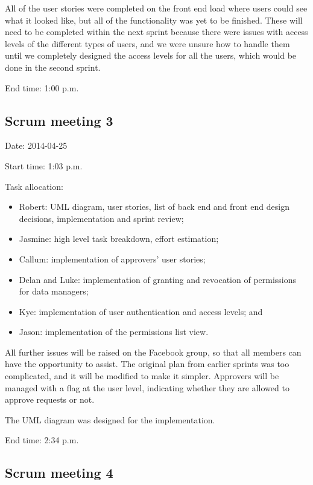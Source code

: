 \documentclass[a4paper,titlepage,12pt]{article}
\begin{document}
All of the user stories were completed on the front end load where users could
see what it looked like, but all of the functionality was yet to be finished.
These will need to be completed within the next sprint because there were
issues with access levels of the different types of users, and we were unsure
how to handle them until we completely designed the access levels for all the
users, which would be done in the second sprint.

End time: 1:00 p.m.

\newpage

\subsection{Scrum meeting 3}

Date: 2014-04-25

Start time: 1:03 p.m.

Task allocation:

\begin{itemize}
	\item Robert: UML diagram, user stories, list of back end and front end
	      design decisions, implementation and sprint review;
	\item Jasmine: high level task breakdown, effort estimation;
	\item Callum: implementation of approvers' user stories;
	\item Delan and Luke: implementation of granting and revocation of
	      permissions for data managers;
	\item Kye: implementation of user authentication and access levels; and
	\item Jason: implementation of the permissions list view.
\end{itemize}

All further issues will be raised on the Facebook group, so that all members
can have the opportunity to assist. The original plan from earlier sprints was
too complicated, and it will be modified to make it simpler. Approvers will be
managed with a flag at the user level, indicating whether they are allowed to
approve requests or not.

The UML diagram was designed for the implementation.

End time: 2:34 p.m.

\newpage

\subsection{Scrum meeting 4}
\end{document}
